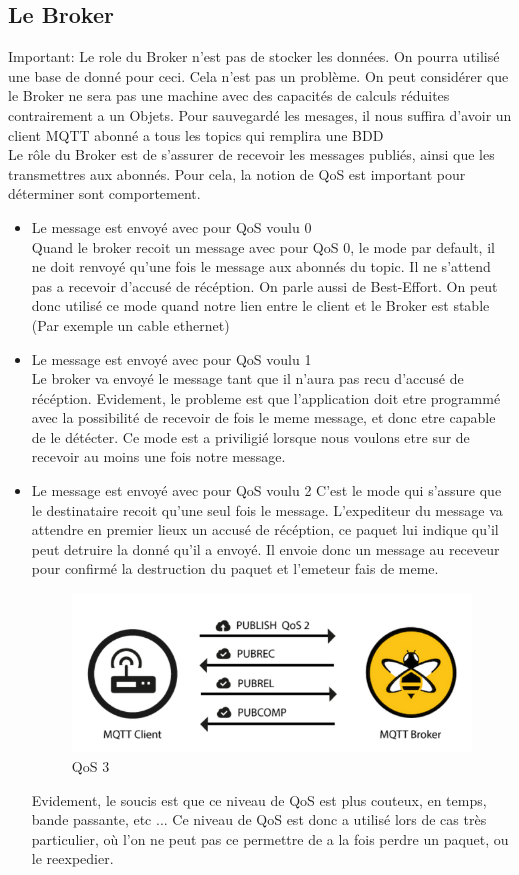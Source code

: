 \documentclass[a4paper,10pt]{article}
\begin{document}
\subsection{Le Broker}
Important: Le role du Broker n'est pas de stocker les données. On pourra utilisé une base de donné pour ceci. Cela n'est pas un problème. On peut considérer que le Broker ne sera pas une machine avec des capacités de calculs réduites contrairement a un Objets. Pour sauvegardé les mesages, il nous suffira d'avoir un client MQTT abonné a tous les topics qui remplira une BDD\\
Le rôle du Broker est de s'assurer de recevoir les messages publiés, ainsi que les transmettres aux abonnés. Pour cela, la notion de QoS est important pour déterminer sont comportement. 
\begin{itemize}
 \item Le message est envoyé avec pour QoS voulu 0\\
 Quand le broker recoit un message avec pour QoS 0, le mode par default, il ne doit renvoyé qu'une fois le message aux abonnés du topic. Il ne s'attend pas a recevoir d'accusé de récéption. On parle aussi de Best-Effort. On peut donc utilisé ce mode quand notre lien entre le client et le Broker est stable (Par exemple un cable ethernet)
 \item Le message est envoyé avec pour QoS voulu 1\\
 Le broker va envoyé le message tant que il n'aura pas recu d'accusé de récéption. Evidement, le probleme est que l'application doit etre programmé avec la possibilité de recevoir de fois le meme message, et donc etre capable de le détécter. Ce mode est a priviligié lorsque nous voulons etre sur de recevoir au moins une fois notre message. 
 \item Le message est envoyé avec pour QoS voulu 2
  C'est le mode qui s'assure que le destinataire recoit qu'une seul fois le message. L'expediteur du message va attendre en premier lieux un accusé de récéption, ce paquet lui indique qu'il peut detruire la donné qu'il a envoyé. Il envoie donc un message au receveur pour confirmé la destruction du paquet et l'emeteur fais de meme.
  \begin{figure}[h!]
\centering
\includegraphics[scale=0.250]{qos.jpg}
\caption{QoS 3}
\label{fig:qos}
\end{figure}

Evidement, le soucis est que ce niveau de QoS est plus couteux, en temps, bande passante, etc ... Ce niveau de QoS est donc a utilisé lors de cas très particulier, où l'on ne peut pas ce permettre de a la fois perdre un paquet,  ou le reexpedier.

\end{itemize}
\end{document}
